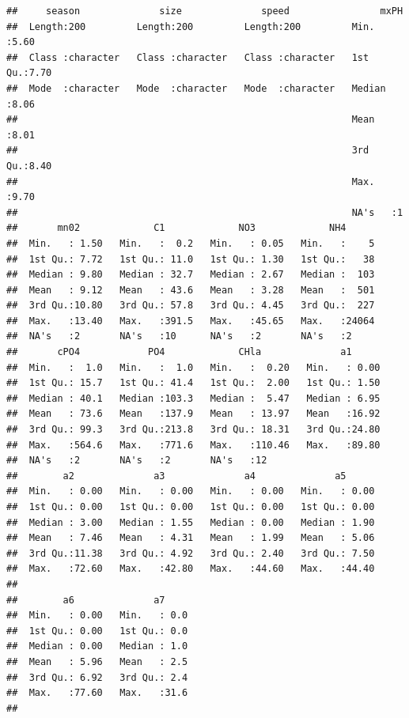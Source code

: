 \documentclass[
]{article}
\begin{document}
\begin{verbatim}
##     season              size              speed                mxPH     
##  Length:200         Length:200         Length:200         Min.   :5.60  
##  Class :character   Class :character   Class :character   1st Qu.:7.70  
##  Mode  :character   Mode  :character   Mode  :character   Median :8.06  
##                                                           Mean   :8.01  
##                                                           3rd Qu.:8.40  
##                                                           Max.   :9.70  
##                                                           NA's   :1     
##       mn02             C1             NO3             NH4       
##  Min.   : 1.50   Min.   :  0.2   Min.   : 0.05   Min.   :    5  
##  1st Qu.: 7.72   1st Qu.: 11.0   1st Qu.: 1.30   1st Qu.:   38  
##  Median : 9.80   Median : 32.7   Median : 2.67   Median :  103  
##  Mean   : 9.12   Mean   : 43.6   Mean   : 3.28   Mean   :  501  
##  3rd Qu.:10.80   3rd Qu.: 57.8   3rd Qu.: 4.45   3rd Qu.:  227  
##  Max.   :13.40   Max.   :391.5   Max.   :45.65   Max.   :24064  
##  NA's   :2       NA's   :10      NA's   :2       NA's   :2      
##       cPO4            PO4             CHla              a1       
##  Min.   :  1.0   Min.   :  1.0   Min.   :  0.20   Min.   : 0.00  
##  1st Qu.: 15.7   1st Qu.: 41.4   1st Qu.:  2.00   1st Qu.: 1.50  
##  Median : 40.1   Median :103.3   Median :  5.47   Median : 6.95  
##  Mean   : 73.6   Mean   :137.9   Mean   : 13.97   Mean   :16.92  
##  3rd Qu.: 99.3   3rd Qu.:213.8   3rd Qu.: 18.31   3rd Qu.:24.80  
##  Max.   :564.6   Max.   :771.6   Max.   :110.46   Max.   :89.80  
##  NA's   :2       NA's   :2       NA's   :12                      
##        a2              a3              a4              a5       
##  Min.   : 0.00   Min.   : 0.00   Min.   : 0.00   Min.   : 0.00  
##  1st Qu.: 0.00   1st Qu.: 0.00   1st Qu.: 0.00   1st Qu.: 0.00  
##  Median : 3.00   Median : 1.55   Median : 0.00   Median : 1.90  
##  Mean   : 7.46   Mean   : 4.31   Mean   : 1.99   Mean   : 5.06  
##  3rd Qu.:11.38   3rd Qu.: 4.92   3rd Qu.: 2.40   3rd Qu.: 7.50  
##  Max.   :72.60   Max.   :42.80   Max.   :44.60   Max.   :44.40  
##                                                                 
##        a6              a7      
##  Min.   : 0.00   Min.   : 0.0  
##  1st Qu.: 0.00   1st Qu.: 0.0  
##  Median : 0.00   Median : 1.0  
##  Mean   : 5.96   Mean   : 2.5  
##  3rd Qu.: 6.92   3rd Qu.: 2.4  
##  Max.   :77.60   Max.   :31.6  
## 
\end{verbatim}
\end{document}
